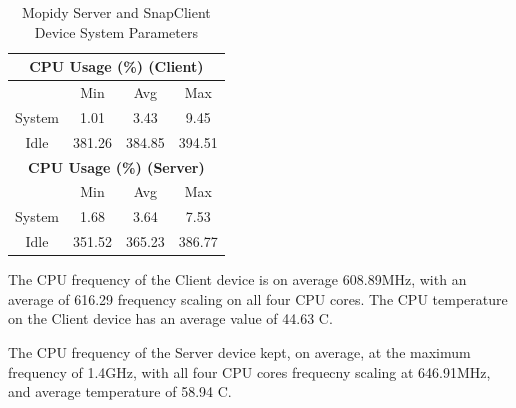 \documentclass[11pt,a4paper,headinclude=false,footinclude=false]{scrreprt}
\begin{document}
\begin{table}[H]
\begin{tabular}{||c|c|c|c|c|c|c||}
    \multicolumn{7}{|c|}{\textbf{CPU Usage (\%) (Client)}} \\
    \hline\hline
      & \multicolumn{2}{|c|}{Min} & \multicolumn{2}{|c|}{Avg} & \multicolumn{2}{|c|}{Max} \\
    \hline
    System & \multicolumn{2}{|c|}{1.01} & \multicolumn{2}{|c|}{3.43} & \multicolumn{2}{|c|}{9.45} \\
    \hline
    Idle & \multicolumn{2}{|c|}{381.26} & \multicolumn{2}{|c|}{384.85} & \multicolumn{2}{|c|}{394.51} \\
    \hline\hline
    \multicolumn{7}{|c|}{\textbf{CPU Usage (\%) (Server)}} \\
    \hline\hline
      & \multicolumn{2}{|c|}{Min} & \multicolumn{2}{|c|}{Avg} & \multicolumn{2}{|c|}{Max} \\
    \hline
    System & \multicolumn{2}{|c|}{1.68} & \multicolumn{2}{|c|}{3.64} & \multicolumn{2}{|c|}{7.53} \\
    \hline
    Idle & \multicolumn{2}{|c|}{351.52} & \multicolumn{2}{|c|}{365.23} & \multicolumn{2}{|c|}{386.77} \\
    \hline\hline
    \end{tabular}
    \caption{Mopidy Server and SnapClient Device System Parameters}
    \label{MopidyclientserverSysTab}
\end{table}

The CPU frequency of the Client device is on average 608.89MHz, with an
average of 616.29 frequency scaling on all four CPU cores. The CPU
temperature on the Client device has an average value of 44.63
\degree C.

The CPU frequency of the Server device kept, on average, at the maximum
frequency of 1.4GHz, with all four CPU cores frequecny scaling at
646.91MHz, and average temperature of 58.94 \degree C.
\end{document}
